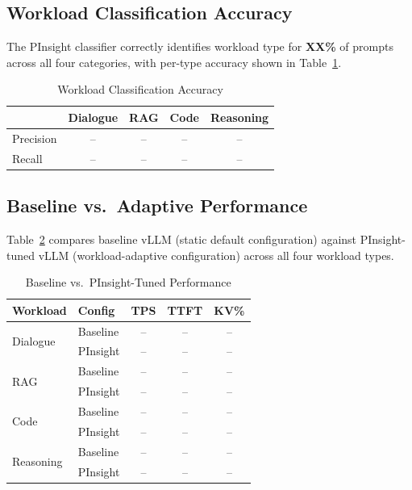 \documentclass[conference]{IEEEtran}
\begin{document}
\subsection{Workload Classification Accuracy}

The PInsight classifier correctly identifies workload type for \textbf{XX\%} of prompts across all four categories, with per-type accuracy shown in Table~\ref{tab:classification}.

\begin{table}[h]
\centering
\caption{Workload Classification Accuracy}
\label{tab:classification}
\begin{tabular}{@{}lcccc@{}}
\toprule
& \textbf{Dialogue} & \textbf{RAG} & \textbf{Code} & \textbf{Reasoning} \\
\midrule
Precision & -- & -- & -- & -- \\
Recall & -- & -- & -- & -- \\
\bottomrule
\end{tabular}
\end{table}

\subsection{Baseline vs.\ Adaptive Performance}

Table~\ref{tab:results} compares baseline vLLM (static default configuration) against PInsight-tuned vLLM (workload-adaptive configuration) across all four workload types.

\begin{table}[h]
\centering
\caption{Baseline vs.\ PInsight-Tuned Performance}
\label{tab:results}
\begin{tabular}{@{}llccc@{}}
\toprule
\textbf{Workload} & \textbf{Config} & \textbf{TPS} & \textbf{TTFT} & \textbf{KV\%} \\
\midrule
\multirow{2}{*}{Dialogue} & Baseline & -- & -- & -- \\
& PInsight & -- & -- & -- \\
\midrule
\multirow{2}{*}{RAG} & Baseline & -- & -- & -- \\
& PInsight & -- & -- & -- \\
\midrule
\multirow{2}{*}{Code} & Baseline & -- & -- & -- \\
& PInsight & -- & -- & -- \\
\midrule
\multirow{2}{*}{Reasoning} & Baseline & -- & -- & -- \\
& PInsight & -- & -- & -- \\
\bottomrule
\end{tabular}
\end{table}
\end{document}
